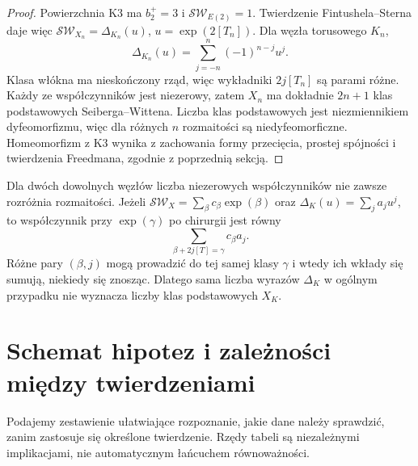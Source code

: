 \begin{proof}
Powierzchnia K3 ma $b_2^+=3$ i $\mathcal{SW}_{E(2)}=1$.
Twierdzenie Fintushela--Sterna daje więc
$\mathcal{SW}_{X_n}=\Delta_{K_n}(u)$,
$u=\exp(2[T_n])$. Dla węzła torusowego $K_n$,
\[
 \Delta_{K_n}(u)=\sum_{j=-n}^n(-1)^{n-j}u^j.
\]
Klasa włókna ma nieskończony rząd, więc wykładniki
$2j[T_n]$ są parami różne. Każdy ze współczynników
jest niezerowy, zatem $X_n$ ma dokładnie $2n+1$
klas podstawowych Seiberga--Wittena.
Liczba klas podstawowych jest niezmiennikiem dyfeomorfizmu,
więc dla różnych $n$ rozmaitości są niedyfeomorficzne.
Homeomorfizm z K3 wynika z zachowania formy przecięcia,
prostej spójności i twierdzenia Freedmana, zgodnie
z poprzednią sekcją.
\end{proof}

\begin{uwaga}
Dla dwóch dowolnych węzłów liczba niezerowych współczynników
nie zawsze rozróżnia rozmaitości. Jeżeli
$\mathcal{SW}_X=\sum_\beta c_\beta\exp(\beta)$ oraz
$\Delta_K(u)=\sum_j a_ju^j$, to współczynnik przy
$\exp(\gamma)$ po chirurgii jest równy
\[
 \sum_{\beta+2j[T]=\gamma}c_\beta a_j.
\]
Różne pary $(\beta,j)$ mogą prowadzić do tej samej klasy
$\gamma$ i wtedy ich wkłady się sumują, niekiedy się znosząc.
Dlatego sama liczba wyrazów $\Delta_K$ w ogólnym przypadku
nie wyznacza liczby klas podstawowych $X_K$.
\end{uwaga}

\section{Schemat hipotez i zależności między twierdzeniami}
\label{sec:tg-syn-assumptions}

Podajemy zestawienie ułatwiające rozpoznanie, jakie dane
należy sprawdzić, zanim zastosuje się określone twierdzenie.
Rzędy tabeli są niezależnymi implikacjami, nie automatycznym
łańcuchem równoważności.

